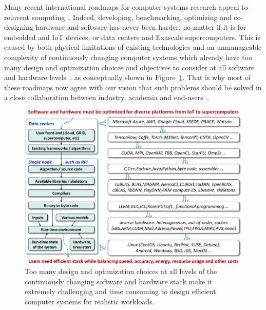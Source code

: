 Many recent international roadmaps for computer systems research
appeal to reinvent computing~\cite{hipeac_roadmap2017,Dongarra:2011:IES:1943326.1943339,prace}.
%
Indeed, developing, benchmarking, optimizing and co-designing hardware and software
has never been harder, no matter if it is for embedded and IoT devices,
or data centers and Exascale supercomputers.
%
This is caused by both physical limitations of existing technologies
and an unmanageable complexity of continuously changing computer systems
which already have too many design and optimization choices and objectives
to consider at all software and hardware levels~\cite{fursin:hal-01054763},
as conceptually shown in Figure~\ref{fig:introduction}.
%
That is why most of these roadmaps now agree with our vision
that such problems should be solved in a close collaboration
between industry, academia and end-users~\cite{Fur2009,cm:29db2248aba45e59:cd11e3a188574d80}.


   \begin{figure}[htb]
     \centering
      \includegraphics[width=5.2in]
      {ck-assets/d6118462b94f89da-cropped.pdf} %

     \caption{
       Too many design and optimization choices at all levels of the continuously changing software and hardware stack
       make it extremely challenging and time consuming to design efficient computer systems for realistic workloads.
     }

     \label{fig:introduction}
   \end{figure}

